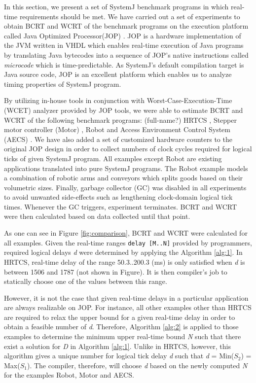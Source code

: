 %
In this section, we present a set of SystemJ benchmark programs in which
real-time requirements should be met.
We have carried out a set of experiments to obtain BCRT and WCRT of the
benchmark programs on the execution platform called Java Optimized
Processor(JOP) \cite{jop:jnl:jsa2007}. JOP is a hardware implementation of the
JVM written in VHDL which enables real-time execution of Java programs by
translating Java bytecodes into a sequence of JOP's native instructions called
\emph{microcode} which is time-predictable. As SystemJ's default compilation
target is Java source code, JOP is an excellent platform which enables us to
analyze timing properties of SystemJ program.


By utilizing in-house tools in conjunction with Worst-Case-Execution-Time (WCET)
analyzer \cite{jop:jnl:jsa2007} provided by JOP tools, we were able to estimate
BCRT and WCRT of the following benchmark programs: (full-name?) HRTCS \cite{},
Stepper motor controller (Motor) \cite{Bourke2009a}, Robot and Access Environment Control
System (AECS) \cite{aecs_ispa}. We have also added a set of customized hardware counters
to the original JOP design in order to collect numbers of clock cycles required
for logical ticks of given SystemJ program. All examples except Robot are
existing applications translated into pure SystemJ programs. The Robot example
models a combination of robotic arms and conveyors which splits goods based on
their volumetric sizes. Finally, garbage collector (GC) was disabled in all
experiments to avoid unwanted side-effects such as lengthening clock-domain
logical tick times. Whenever the GC triggers, experiment terminates. BCRT and
WCRT were then calculated based on data collected until that point.

As one can see in Figure \ref{fig:comparison}, BCRT and WCRT were calculated for
all examples. Given the real-time ranges \mbox{\texttt{delay [M..N]}} provided
by programmers, required logical delays \emph{d} were determined by applying the
Algorithm \ref{alg:1}. In HRTCS, real-time delay of the range 50.3..200.3 (ms)
is only satisfied when \emph{d} is between 1506 and 1787 (not shown in Figure).
It is then compiler's job to statically choose one of the values between this
range.

However, it is not the case that given real-time delays in a particular
application are always realizable on JOP. For instance, all other examples other
than HRTCS are required to relax the upper bound for a given real-time delay in
order to obtain a feasible number of \emph{d}. Therefore, Algorithm \ref{alg:2}
is applied to those examples to determine the minimum upper real-time bound
\emph{N} such that there exist a solution for \emph{D} in Algorithm \ref{alg:1}.
Unlike in HRTCS, however, this algorithm gives a unique number for logical tick
delay \emph{d} such that \emph{d} = Min(\emph{$S_2$}) = Max(\emph{$S_1$}).
The compiler, therefore, will choose \emph{d} based on the newly computed
\emph{N} for the examples Robot, Motor and AECS.


